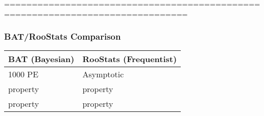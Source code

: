 \begin{frame}

	{\color{white}===============================================================================}
	\frametitle{BAT/RooStats Comparison}
	
	\begin{center}
	
	\begin{tabularx}{0.95\textwidth}{|X|X|}
	\arrayrulecolor{white}								
	\hline
	\rowcolor{ATLASBlue} {\color{white}\bfseries{BAT (Bayesian)}} & {\color{white}\bfseries{RooStats (Frequentist)}} \\
	\hline
	\rowcolor{ATLASBlue_lightest} 1000 PE & Asymptotic \\
	\rowcolor{ATLASBlue_lighter} property & property \\
	\rowcolor{ATLASBlue_lightest}property & property \\
	\hline
\end{tabularx} 

	\end{center}
	

\end{frame}